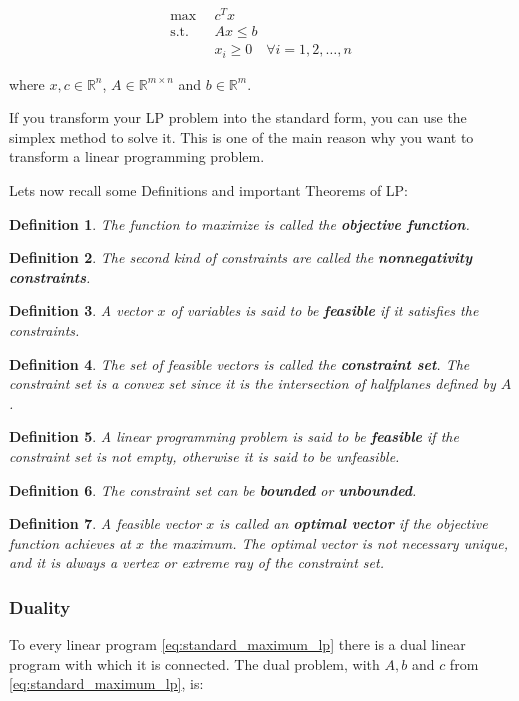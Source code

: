 \documentclass[a4paper,12pt]{article}
\newtheorem{Def}{Definition}
\begin{document}
\begin{equation}
\begin{aligned}  
\max \enspace &c^{T}x \\
\text{s.t.} \enspace &Ax \leq b \\
&x_i \geq 0 \quad \forall i = 1,2, \dots ,n
\label{eq:standard_maximum_lp}
\end{aligned}
\end{equation}

where $x,c \in \mathbb{R}^n$, $A \in \mathbb{R}^{m \times n}$ and $b \in \mathbb{R}^m$.

If you transform your LP problem into the standard form, you can use the simplex method to solve it. This is one of the main reason why you want to transform a linear programming problem.


Lets now recall some Definitions and important Theorems of LP: 



\begin{Def}
The function to maximize is called the \textbf{objective function}.
\end{Def}
\begin{Def}
The second kind of constraints are called the \textbf{nonnegativity constraints}.
\end{Def}
\begin{Def}
A vector $x$ of variables is said to be \textbf{feasible} if it satisfies the constraints.
\end{Def}
\begin{Def}
The set of feasible vectors is called the \textbf{constraint set}. The constraint set is a convex set since it is the intersection of halfplanes defined by $A$.
\end{Def}
\begin{Def}
A linear programming problem is said to be \textbf{feasible} if the constraint set is not empty, otherwise it is said to be unfeasible.
\end{Def}
\begin{Def}
The constraint set can be \textbf{bounded} or \textbf{unbounded}.
\end{Def}
\begin{Def} 
A feasible vector $x$ is called an \textbf{optimal vector} if the objective function achieves at $x$ the maximum. The optimal vector is not necessary unique, and it is always a vertex or extreme ray of the constraint set.
\end{Def}

\subsubsection*{Duality}
To every linear program \eqref{eq:standard_maximum_lp} there is a dual linear program with which it is connected. The dual problem, with $A,b$ and $c$  from \eqref{eq:standard_maximum_lp}, is:
\end{document}
